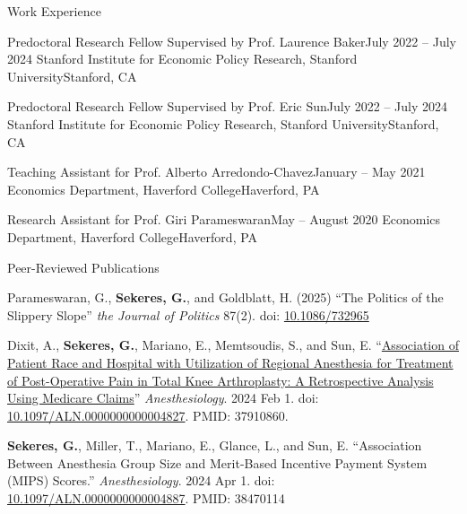 \documentclass{resume}
\begin{document}
\begin{rSection}{Work Experience}

\begin{rSubsection}{Predoctoral Research Fellow Supervised by Prof. Laurence Baker}{July 2022 -- July 2024}{  Stanford Institute for Economic Policy Research, Stanford University}{Stanford, CA}
\item[]
\vspace{-1cm}
\end{rSubsection}
\begin{rSubsection}{Predoctoral Research Fellow Supervised by Prof. Eric Sun}{July 2022 -- July 2024}{  Stanford Institute for Economic Policy Research, Stanford University}{Stanford, CA}
\item[]
\vspace{-1cm}
\end{rSubsection}

\begin{rSubsection}{Teaching Assistant for Prof. Alberto Arredondo-Chavez}{January -- May 2021}{  Economics Department, Haverford College}{Haverford, PA}
\item[]
\vspace{-1cm}
\end{rSubsection}

\begin{rSubsection}{Research Assistant for Prof. Giri Parameswaran}{May -- August 2020}{  Economics Department, Haverford College}{Haverford, PA}
\item[]
\vspace{-1cm}
\end{rSubsection}
 \end{rSection}
\begin{rSection}{Peer-Reviewed Publications}
\vspace{-0.5cm}
	\item Parameswaran, G., \textbf{Sekeres, G.}, and Goldblatt, H. (2025) ``The Politics of the Slippery Slope'' \emph{the Journal of Politics} 87(2). doi: \href{https://doi.org/10.1086/732965}{10.1086/732965}
    \item Dixit, A., \textbf{Sekeres, G.}, Mariano, E., Memtsoudis, S., and Sun, E. ``\href{https://pubmed.ncbi.nlm.nih.gov/37910860/}{Association of Patient Race and Hospital with Utilization of Regional Anesthesia for Treatment of Post-Operative Pain in Total Knee Arthroplasty: A Retrospective Analysis Using Medicare Claims}'' \emph{Anesthesiology}. 2024 Feb 1. doi: \href{https://doi.org/10.1097/aln.0000000000004827}{10.1097/ALN.0000000000004827}. PMID: 37910860.

    \item \textbf{Sekeres, G.}, Miller, T., Mariano, E., Glance, L., and Sun, E. ``Association Between Anesthesia Group Size and Merit-Based Incentive Payment System (MIPS) Scores.'' \emph{Anesthesiology}. 2024 Apr 1. doi: \href{https://doi.org/10.1097/ALN.0000000000004887}{10.1097/ALN.0000000000004887}. PMID: 38470114
\end{rSection}
\end{document}
